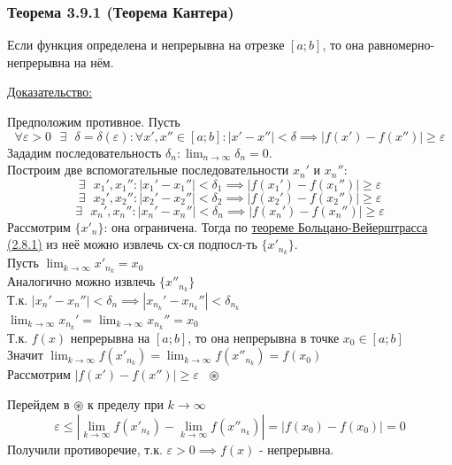 \documentclass[12pt]{article}
\def\posl#1#2{\{#1_{#2}\}}
\begin{document}
    \subsubsection*{Теорема 3.9.1 (Теорема Кантера)}\label{th:3.9.1}
    Если функция определена и непрерывна на отрезке $[a; b]$, то она равномерно-непрерывна на нём.\par\noindent
    \underline{Доказательство:}
    \begin{adjustwidth}{1.5em}{1.5em}
        Предположим противное. Пусть \[\forall \varepsilon > 0 \text{ } \exists \text{ } \delta = \delta(\varepsilon) : \forall x', x'' \in [a;b] :  |x' - x''| < \delta \implies |f(x') - f(x'')| \ge \varepsilon \]
        Зададим последовательность $\delta_n : \lim_{n\to\infty} \delta_n = 0$.\\
        Построим две вспомогательные последовательности $x_n'$ и $x_n''$:
        \[ \exists \text{ } x_1', x_1'' : |x_1' - x_1''| < \delta_1 \implies |f(x_1') - f(x_1'')| \ge \varepsilon \]
        \[ \exists \text{ } x_2', x_2'' : |x_2' - x_2''| < \delta_2 \implies |f(x_2') - f(x_2'')| \ge \varepsilon \]
        \[ \exists \text{ } x_n', x_n'' : |x_n' - x_n''| < \delta_n \implies |f(x_n') - f(x_n'')| \ge \varepsilon \]
        Рассмотрим $\posl{x'}{n}$: она ограничена. Тогда по \hyperref[th:2.8.1]{теореме Больцано-Вейерштрасса (2.8.1)} из неё можно извлечь сх-ся подпосл-ть $\posl{x'}{n_k}$.\\
        Пусть $\lim_{k\to\infty} x'_{n_k} = x_0$\\
        Аналогично можно извлечь $\posl{x''}{n_k}$\\
        Т.к. $|x_n' - x_n''| < \delta_n \implies |x_{n_k}' - x_{n_k}''| < \delta_{n_k}$\\
        $\lim_{k\to\infty}x_{n_k}' = \lim_{k\to\infty}x_{n_k}'' = x_0$\\
        Т.к. $f(x)$ непрерывна на $[a; b]$, то она непрерывна в точке $x_0 \in [a;b]$\\
        Значит $\lim_{k\to\infty}f(x'_{n_k}) = \lim_{k\to\infty}f(x''_{n_k}) = f(x_0)$\\
        Рассмотрим $|f(x') - f(x'')| \ge \varepsilon \,\,\,\, \circledast$
        \begin{adjustwidth}{1.5em}{1.5em}
            Перейдем в $\circledast$ к пределу при $k \to \infty$
            \[ \varepsilon \le | \lim_{k\to\infty}f(x'_{n_k}) - \lim_{k\to\infty}f(x''_{n_k})| = |f(x_0) - f(x_0)| = 0 \]
            Получили противоречие, т.к. $\varepsilon > 0 \implies f(x)$ - непрерывна.
        \end{adjustwidth}
    \end{adjustwidth}
\end{document}
